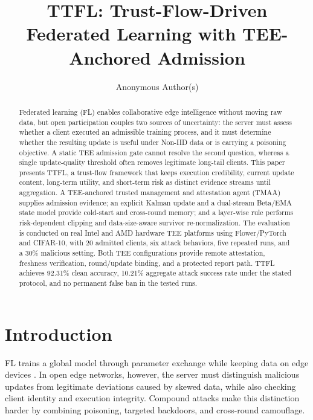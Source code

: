\documentclass[runningheads,orivec]{llncs}
\begin{document}
\title{TTFL: Trust-Flow-Driven Federated Learning with TEE-Anchored Admission}

\author{Anonymous Author(s)}
\institute{}

\maketitle

\begin{abstract}
    Federated learning (FL) enables collaborative edge intelligence without moving raw data, but open participation couples two sources of uncertainty: the server must assess whether a client executed an admissible training process, and it must determine whether the resulting update is useful under Non-IID data or is carrying a poisoning objective. A static TEE admission gate cannot resolve the second question, whereas a single update-quality threshold often removes legitimate long-tail clients. This paper presents TTFL, a trust-flow framework that keeps execution credibility, current update content, long-term utility, and short-term risk as distinct evidence streams until aggregation. A TEE-anchored trusted management and attestation agent (TMAA) supplies admission evidence; an explicit Kalman update and a dual-stream Beta/EMA state model provide cold-start and cross-round memory; and a layer-wise rule performs risk-dependent clipping and data-size-aware survivor re-normalization. The evaluation is conducted on real Intel and AMD hardware TEE platforms using Flower/PyTorch and CIFAR-10, with 20 admitted clients, six attack behaviors, five repeated runs, and a 30\% malicious setting. Both TEE configurations provide remote attestation, freshness verification, round/update binding, and a protected report path. TTFL achieves 92.31\% clean accuracy, 10.21\% aggregate attack success rate under the stated protocol, and no permanent false ban in the tested runs.
\end{abstract}

\section{Introduction}

FL trains a global model through parameter exchange while keeping data on edge devices \cite{kairouz2021flsurvey,mcmahan2017fedavg}. In open edge networks, however, the server must distinguish malicious updates from legitimate deviations caused by skewed data, while also checking client identity and execution integrity. Compound attacks make this distinction harder by combining poisoning, targeted backdoors, and cross-round camouflage.
\end{document}
